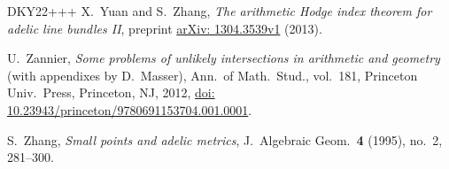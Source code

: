 \documentclass[10pt,a4paper]{amsart}
\numberwithin{equation}{section}
\theoremstyle{plain}
\theoremstyle{definition}
\theoremstyle{remark}
\providecommand{\doi}[1]{\href{https://doi.org/#1}{doi: #1}}
\providecommand{\arXiv}[1]{\href{https://arxiv.org/abs/#1}{arXiv: #1}}
\begin{document}
\begin{thebibliography}{DKY22+++}
X.~Yuan and S.~Zhang,
\emph{The arithmetic Hodge index theorem for adelic line bundles II},
preprint \arXiv{1304.3539v1} (2013). 

U.~Zannier,
\emph{Some problems of unlikely intersections in arithmetic and geometry} (with appendixes by D.~Masser),
Ann.\ of Math.\ Stud., vol.~181,
Princeton Univ.\ Press, Princeton, NJ, 2012,
\doi{10.23943/princeton/9780691153704.001.0001}.

S.~Zhang,
\emph{Small points and adelic metrics},
J.~Algebraic Geom.\ \textbf{4} (1995), no.~2, 281--300.
\end{thebibliography}
\end{document}
